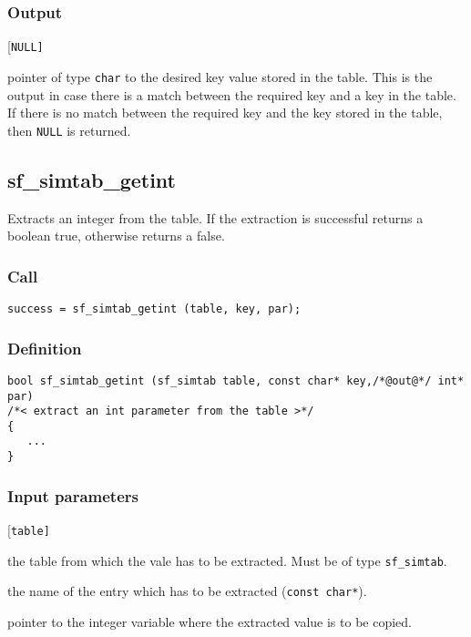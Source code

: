 \subsubsection*{Output}
\begin{desclist}{\tt }{\quad}[\tt NULL]
   \setlength\itemsep{0pt}
   \item[val] pointer of type \texttt{char} to the desired key value stored in the table. This is the output in case there is a match between the required key and a key in the table. If there is no match between the required key and the key stored in the table, then \texttt{NULL} is returned.
\end{desclist}




\subsection{{sf\_simtab\_getint}}\label{sec:sf_simtab_getint}
Extracts an integer from the table. If the extraction is successful returns a boolean true, otherwise returns a false.

\subsubsection*{Call}
\begin{verbatim}success = sf_simtab_getint (table, key, par);\end{verbatim}

\subsubsection*{Definition}
\begin{verbatim}
bool sf_simtab_getint (sf_simtab table, const char* key,/*@out@*/ int* par)
/*< extract an int parameter from the table >*/
{
   ...
}
\end{verbatim}

\subsubsection*{Input parameters}
\begin{desclist}{\tt }{\quad}[\tt table]
   \setlength\itemsep{0pt}
   \item[table] the table from which the vale has to be extracted. Must be of type \texttt{sf\_simtab}.
   \item[key]   the name of the entry which has to be extracted (\texttt{const char*}).
   \item[par]   pointer to the integer variable where the extracted value is to be copied.
\end{desclist}

